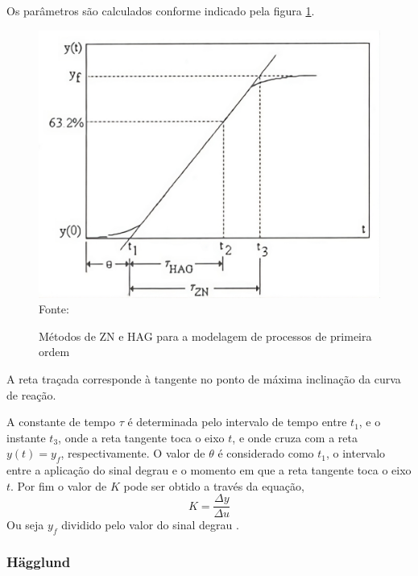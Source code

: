 Os parâmetros são calculados conforme indicado pela figura \ref{fig:zn_hg_ident_meth}.
\begin{figure}[H]
    \centering
    \caption{Métodos de ZN e HAG para a modelagem de processos de primeira ordem}
    \includegraphics[scale=0.3]{figuras/zn_hg_ident_meth}
    \label{fig:zn_hg_ident_meth}
    \\
    \vspace{0cm}\hspace{0cm}\small{Fonte: \cite{CoelhoIdentificacao}}
\end{figure}

A reta traçada corresponde à tangente no ponto de máxima inclinação da curva de reação.

A constante de tempo $\tau$ é determinada pelo intervalo de tempo entre $t_1$, e o instante
$t_3$, onde a reta tangente toca o eixo $t$, e onde cruza com a reta $y(t) = y_f$,
respectivamente.
O valor de  $\theta$ é considerado como $t_1$, o intervalo entre a aplicação do sinal degrau e o
momento em que a reta tangente toca o eixo $t$.
Por fim o valor de $K$ pode ser obtido a través da equação,
\begin{equation}
    \label{eq:dydu}
    K = \frac{\Delta y}{\Delta u}
\end{equation}
Ou seja $y_f$ dividido pelo valor do sinal degrau \cite{CoelhoIdentificacao}.

\subsubsection{Hägglund}\label{subsubsec:hagfun}

